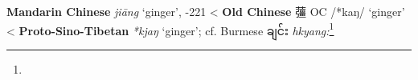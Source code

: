 \begin{etymology}\label{ety:jiang}
\textbf{Mandarin Chinese}  \textit{jiāng} `ginger', -221
< \textbf{Old Chinese} {䕬} OC /*kaŋ/ `ginger'
< \textbf{Proto-Sino-Tibetan} \textit{*kjaŋ} `ginger'; cf. Burmese ချင်း \textit{hkyang:}\footnote{}
\end{etymology}